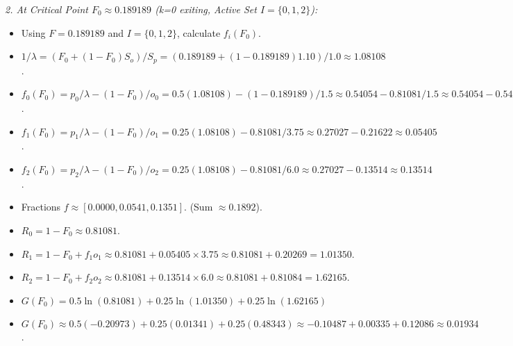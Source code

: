 \documentclass[11pt, letterpaper]{article}
\theoremstyle{definition}
\begin{document}
\emph{2. At Critical Point $F_0 \approx 0.189189$ (k=0 exiting, Active Set $I=\{0, 1, 2\}$):}
\begin{itemize}
    \item Using $F=0.189189$ and $I=\{0, 1, 2\}$, calculate $f_i(F_0)$.
    \item $1/\lambda = (F_0 + (1-F_0)S_o)/S_p = (0.189189 + (1-0.189189)1.10)/1.0 \approx 1.08108$.
    \item $f_0(F_0) = p_0/\lambda - (1-F_0)/o_0 = 0.5(1.08108) - (1-0.189189)/1.5 \approx 0.54054 - 0.81081/1.5 \approx 0.54054 - 0.54054 = 0$.
    \item $f_1(F_0) = p_1/\lambda - (1-F_0)/o_1 = 0.25(1.08108) - 0.81081/3.75 \approx 0.27027 - 0.21622 \approx 0.05405$.
    \item $f_2(F_0) = p_2/\lambda - (1-F_0)/o_2 = 0.25(1.08108) - 0.81081/6.0 \approx 0.27027 - 0.13514 \approx 0.13514$.
    \item Fractions $f \approx [0.0000, 0.0541, 0.1351]$. (Sum $\approx 0.1892$).
    \item $R_0 = 1 - F_0 \approx 0.81081$.
    \item $R_1 = 1 - F_0 + f_1 o_1 \approx 0.81081 + 0.05405 \times 3.75 \approx 0.81081 + 0.20269 = 1.01350$.
    \item $R_2 = 1 - F_0 + f_2 o_2 \approx 0.81081 + 0.13514 \times 6.0 \approx 0.81081 + 0.81084 = 1.62165$.
    \item $G(F_0) = 0.5 \ln(0.81081) + 0.25 \ln(1.01350) + 0.25 \ln(1.62165)$
    \item $G(F_0) \approx 0.5(-0.20973) + 0.25(0.01341) + 0.25(0.48343) \approx -0.10487 + 0.00335 + 0.12086 \approx 0.01934$.
\end{itemize}
\end{document}
